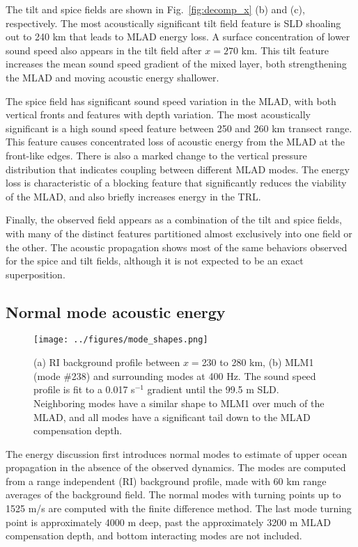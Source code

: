 \documentclass[preprint,NumberedRefs]{JASA}
\begin{document}
The tilt and spice fields are shown in Fig.~\ref{fig:decomp_x} (b) and (c), respectively. The most acoustically significant tilt field feature is SLD shoaling out to 240 km that leads to MLAD energy loss. A surface concentration of lower sound speed also appears in the tilt field after $x=270$ km. This tilt feature increases the mean sound speed gradient of the mixed layer, both strengthening the MLAD and moving acoustic energy shallower.

The spice field has significant sound speed variation in the MLAD, with both vertical fronts and features with depth variation. The most acoustically significant is a high sound speed feature between 250 and 260 km transect range. This feature causes concentrated loss of acoustic energy from the MLAD at the front-like edges. There is also a marked change to the vertical pressure distribution that indicates coupling between different MLAD modes. The energy loss is characteristic of a blocking feature\cite{colosi2020observations} that significantly reduces the viability of the MLAD, and also briefly increases energy in the TRL.

Finally, the observed field appears as a combination of the tilt and spice fields, with many of the distinct features partitioned almost exclusively into one field or the other. The acoustic propagation shows most of the same behaviors observed for the spice and tilt fields, although it is not expected to be an exact superposition.

\subsection{Normal mode acoustic energy}
\begin{figure}
\texttt{[image: ../figures/mode\_shapes.png]}
    \caption{\label{fig:bg_modes}{(a) RI background profile between $x=$230 to 280 km, (b) MLM1 (mode \#238) and surrounding modes at 400 Hz. The sound speed profile is fit to a 0.017 s$^{-1}$ gradient until the 99.5 m SLD. Neighboring modes have a similar shape to MLM1 over much of the MLAD, and all modes have a significant tail down to the MLAD compensation depth.}}
\end{figure}

The energy discussion first introduces normal modes to estimate of upper ocean propagation in the absence of the observed dynamics. The modes are computed from a range independent (RI) background profile, made with 60 km range averages of the background field. The normal modes with turning points up to 1525 m/s are computed with the finite difference method.\cite{jensen2011computational} The last mode turning point is approximately 4000 m deep, past the approximately 3200 m MLAD compensation depth, and bottom interacting modes are not included.
\end{document}
